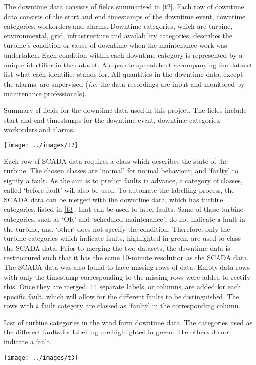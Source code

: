 The downtime data consists of fields summarised in \autoref{t2}. Each row of
downtime data consists of the start and end timestamps of the downtime event,
downtime categories, workorders and alarms. Downtime categories, which are
turbine, environmental, grid, infrastructure and availability categories,
describes the turbine's condition or cause of downtime when the maintenance
work was undertaken. Each condition within each downtime category is
represented by a unique identifier in the dataset. A separate spreadsheet
accompanying the dataset list what each identifier stands for. All quantities
in the downtime data, except the alarms, are supervised (\textit{i.e.} the data
recordings are input and monitored by maintenance professionals).

\begin{table}
  \centering
  \caption{\label{t2}Summary of fields for the downtime data used in this
  project. The fields include start and end timestamps for the downtime event,
  downtime categories, workorders and alarms.}
  \texttt{[image: ../images/t2]}
\end{table}

Each row of SCADA data requires a class which describes the state of the
turbine. The chosen classes are `normal' for normal behaviour, and `faulty' to
signify a fault. As the aim is to predict faults in advance, a category of
classes, called `before fault' will also be used. To automate the labelling
process, the SCADA data can be merged with the downtime data, which has
turbine categories, listed in \autoref{t3}, that can be used to label faults.
Some of these turbine categories, such as `OK' and `scheduled maintenance', do
not indicate a fault in the turbine, and `other' does not specify the
condition. Therefore, only the turbine categories which indicate faults,
highlighted in green, are used to class the SCADA data. Prior to merging the
two datasets, the downtime data is restructured such that it has the same
10-minute resolution as the SCADA data. The SCADA data was also found to have
missing rows of data. Empty data rows with only the timestamp corresponding to
the missing rows were added to rectify this. Once they are merged, 14 separate
labels, or columns, are added for each specific fault, which will allow for
the different faults to be distinguished. The rows with a fault category are
classed as `faulty' in the corresponding column.

\begin{table}
  \centering
  \caption{\label{t3}List of turbine categories in the wind farm downtime
  data. The categories used as the different faults for labelling are
  highlighted in green. The others do not indicate a fault.}
  \texttt{[image: ../images/t3]}
\end{table}

